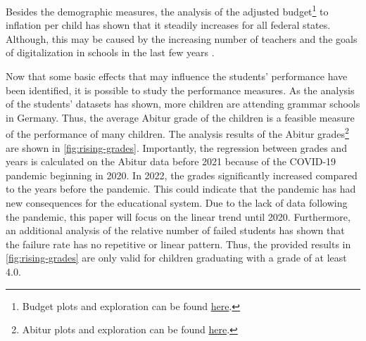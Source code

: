 
Besides the demographic measures, the analysis of the adjusted budget\footnote{\label{footnote:budget}Budget plots and exploration can be found \href{https://github.com/KarylReyne/DataLiteracyWS23/blob/main/exp/TF-007-SchoolBudgets.ipynb}{here}.} to inflation per child has shown that it steadily increases for all federal states. Although, this may be caused by the increasing number of teachers and the goals of digitalization in schools in the last few years \cite{cone_pandemic_2022}.

Now that some basic effects that may influence the students' performance have been identified, it is possible to study the performance measures. As the analysis of the students' datasets has shown, more children are attending grammar schools in Germany. Thus, the average Abitur grade of the children is a feasible measure of the performance of many children. The analysis results of the Abitur grades\footnote{\label{footnote:abi}Abitur plots and exploration can be found \href{https://github.com/KarylReyne/DataLiteracyWS23/blob/main/exp/TF-001-ExploreABIGrades.ipynb}{here}.} are shown in \autoref{fig:rising-grades}. Importantly, the regression between grades and years is calculated on the Abitur data before 2021 because of the COVID-19 pandemic beginning in 2020. In 2022, the grades significantly increased compared to the years before the pandemic. This could indicate that the pandemic has had new consequences for the educational system. Due to the lack of data following the pandemic, this paper will focus on the linear trend until 2020. Furthermore, an additional analysis of the relative number of failed students has shown that the failure rate has no repetitive or linear pattern. Thus, the provided results in \autoref{fig:rising-grades} are only valid for children graduating with a grade of at least 4.0.

